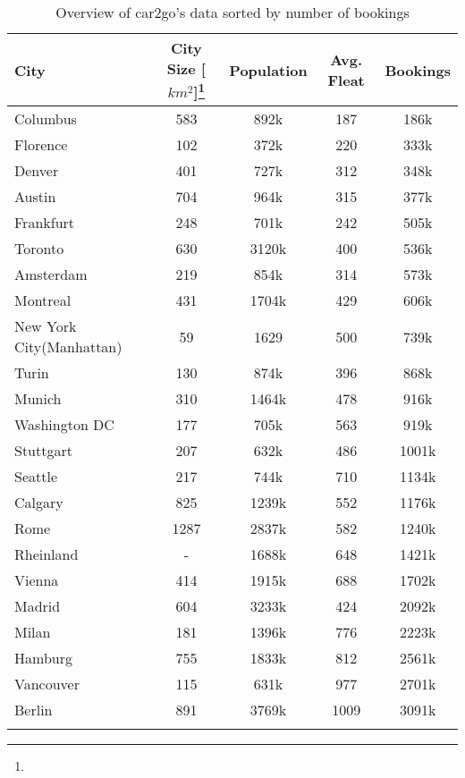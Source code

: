 \begin{table}
	\setlength{\tabcolsep}{2.3pt}
	\centering
	\caption{Overview of car2go's data sorted by number of bookings}
	\begin{tabular}{lcccc}
		\hline
		City &  City Size [$km^2$]\footnote{} & Population \footnotemark[\value{footnote}] &  Avg. Fleat & Bookings\\ 
		\hline
		\hline
		Columbus			  & 583 & 892k & 187 & 186k \\
		Florence 	  			& 102 & 372k & 220 & 333k \\
		Denver 		  			 & 401 & 727k & 312 & 348k \\
		Austin 		   			  & 704 & 964k & 315 & 377k \\
		Frankfurt 			   & 248 & 701k & 242 & 505k \\
		Toronto 				 & 630 & 3120k & 400 & 536k \\
		Amsterdam 			& 219 & 854k & 314 & 573k \\
		Montreal 				& 431 & 1704k & 429 & 606k \\
		New York City(Manhattan) 	   & 59 & 1629 & 500 & 739k \\
		Turin 					    & 130 & 874k & 396 & 868k \\
		Munich 					 & 310 & 1464k & 478 & 916k \\
		Washington DC 	  & 177 & 705k & 563 & 919k \\
		Stuttgart 				 & 207 & 632k & 486 & 1001k \\
		Seattle 				   & 217 & 744k & 710 & 1134k \\
		Calgary 				  & 825 & 1239k & 552 & 1176k \\
		Rome 					  & 1287 & 2837k & 582 & 1240k \\
		Rheinland 			   &  - & 1688k & 648 & 1421k \\
		Vienna 					  & 414 & 1915k & 688 & 1702k \\
		Madrid 					 & 604 & 3233k & 424 & 2092k \\
		Milan 					   & 181 & 1396k & 776 & 2223k \\
		Hamburg 			  & 755 & 1833k & 812 & 2561k \\
		Vancouver 			 & 115 & 631k & 977 & 2701k \\
		Berlin 					  & 891 & 3769k & 1009 & 3091k \\
		\hline
		\label{tab:2_3_datasummary}
	\end{tabular}
\end{table}


